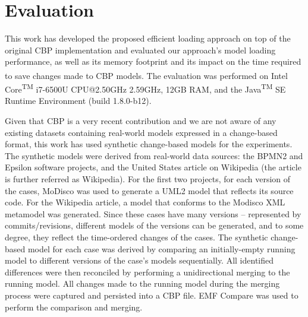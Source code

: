 {\section{Evaluation}
\label{sec:evaluation_4}

This work has developed the proposed efficient loading approach on top of the original CBP implementation \cite{DBLP:conf/models/YohannisKP17,epsilonlabs2019emfcbp} and evaluated our approach's model loading performance, as well as its memory footprint and its impact on the time required to save changes made to CBP models. The evaluation was performed on Intel\textsuperscript{\textregistered} Core\textsuperscript{TM} i7-6500U CPU@2.50GHz 2.59GHz, 12GB RAM, and the Java\textsuperscript{TM} SE Runtime Environment (build 1.8.0-b12).

Given that CBP is a very recent contribution and we are not aware of any existing datasets containing real-world models expressed in a change-based format, this work has used synthetic change-based models for the experiments. The synthetic models were derived from real-world data sources: the BPMN2 \cite{eclipse2017bpmn2,eclipse2018bpmn2git} and Epsilon \cite{eclipse2017epsilon,eclipse2018epsilongit} software projects, and the United States article \cite{wikipedia2018us} on Wikipedia (the article is further referred as Wikipedia). For the first two projects, for each version of the cases, MoDisco \cite{DBLP:journals/infsof/BruneliereCDM14} was used to generate a UML2 \cite{eclipse2017uml2} model that reflects its source code. For the Wikipedia article, a model that conforms to the Modisco XML metamodel \cite{eclipse2018modiscoxml} was generated. Since these cases have many versions -- represented by commits/revisions, different models of the versions can be generated, and to some degree, they reflect the time-ordered changes of the cases. The synthetic change-based model for each case was derived by comparing an initially-empty running model to different versions of the case's models sequentially. All identified differences were then reconciled by performing a unidirectional merging to the running model. All changes made to the running model during the merging process were captured and persisted into a CBP file. EMF Compare was used \cite{eclipse2017compare} to perform the comparison and merging.

}
